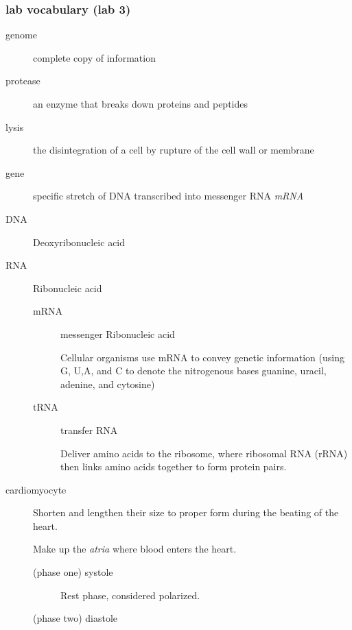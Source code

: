 \documentclass[11pt]{article}
\begin{document}
\subsubsection{lab vocabulary (lab 3)}
\label{sec:org96a3135}

\begin{description}
\item[{genome}] complete copy of information

\item[{protease}] an enzyme that breaks down proteins and peptides

\item[{lysis}] the disintegration of a cell by rupture of the cell wall or
membrane

\item[{gene}] specific stretch of DNA transcribed into messenger RNA \emph{mRNA}

\item[{DNA}] Deoxyribonucleic acid

\item[{RNA}] Ribonucleic acid

\begin{description}
\item[{mRNA}] messenger Ribonucleic acid

Cellular organisms use mRNA to convey genetic information (using G,
U,A, and C to denote the nitrogenous bases guanine, uracil, adenine,
and cytosine)

\item[{tRNA}] transfer RNA

Deliver amino acids to the ribosome, where ribosomal RNA (rRNA) then
links amino acids together to form protein pairs.
\end{description}

\item[{cardiomyocyte}] Shorten and lengthen their size to proper form during the
beating of the heart.

Make up the \emph{atria} where blood enters the heart.

\begin{description}
\item[{(phase one) systole}] Rest phase, considered polarized.

\item[{(phase two) diastole}] 
\end{description}
\end{description}
\end{document}

